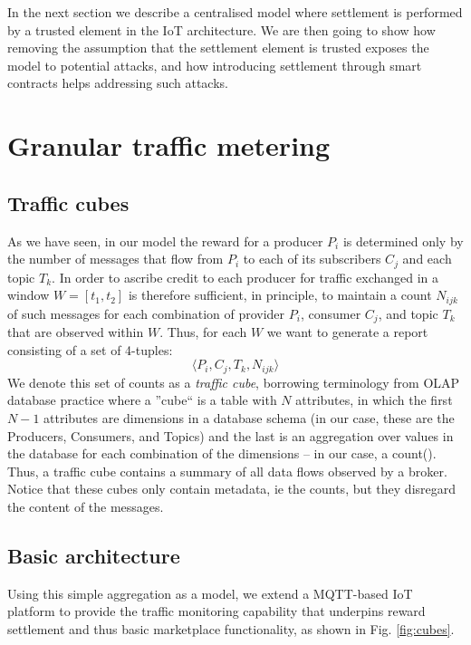 \documentclass[conference]{IEEEtran}
\begin{document}
In the next section we describe a centralised model where settlement is performed by a trusted element in the IoT architecture.
We are then going to show how removing the assumption that the settlement element is trusted exposes the model to potential attacks, and how introducing settlement through smart contracts helps addressing such attacks.

\section{Granular traffic metering}

\subsection{Traffic cubes}

As we have seen, in our model the reward for a producer $ P_i $ is determined only by the number of messages that flow from $ P_i $ to each of its subscribers $ C_j $ and each topic $ T_k $.
In order to ascribe credit to each producer for traffic exchanged in a window $ W = [t_1, t_2] $ is therefore sufficient, in principle, to maintain a count $ N_{ijk} $ of such messages for each combination of provider $ P_i $, consumer $ C_j $, and topic $ T_k $ that are observed within $ W $.
Thus, for each $ W $ we want to generate a report consisting of a set of 4-tuples:
\[  \langle P_i, C_j, T_k, N_{ijk} \rangle  \]
We denote this set of counts as a \textit{traffic cube}, borrowing terminology from OLAP database practice where a ''cube`` is a table with $ N $ attributes, in which the first $ N-1 $ attributes are  dimensions in a database schema (in our case, these are the Producers, Consumers, and Topics) and the last is an aggregation over values in the database for each combination of the dimensions -- in our case, a count().
Thus, a traffic cube contains a summary  of all data flows observed by a broker. Notice that these cubes only contain metadata, ie the counts, but they disregard the content of the messages.

\subsection{Basic architecture}

Using this simple aggregation as a model, we extend a  MQTT-based IoT platform to provide the traffic monitoring capability that underpins reward settlement and thus basic marketplace functionality, as shown in Fig. \ref{fig:cubes}.
\end{document}
